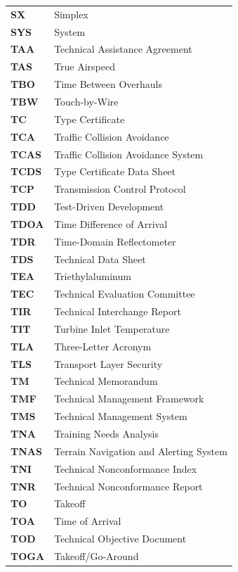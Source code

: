 \begin{longtable}{p{3cm}p{11cm}}
\textbf{SX} & Simplex \\
\textbf{SYS} & System \\
\textbf{TAA} & Technical Assistance Agreement \\
\textbf{TAS} & True Airspeed \\
\textbf{TBO} & Time Between Overhauls \\
\textbf{TBW} & Touch-by-Wire \\
\textbf{TC} & Type Certificate \\
\textbf{TCA} & Traffic Collision Avoidance \\
\textbf{TCAS} & Traffic Collision Avoidance System \\
\textbf{TCDS} & Type Certificate Data Sheet \\
\textbf{TCP} & Transmission Control Protocol \\
\textbf{TDD} & Test-Driven Development \\
\textbf{TDOA} & Time Difference of Arrival \\
\textbf{TDR} & Time-Domain Reflectometer \\
\textbf{TDS} & Technical Data Sheet \\
\textbf{TEA} & Triethylaluminum \\
\textbf{TEC} & Technical Evaluation Committee \\
\textbf{TIR} & Technical Interchange Report \\
\textbf{TIT} & Turbine Inlet Temperature \\
\textbf{TLA} & Three-Letter Acronym \\
\textbf{TLS} & Transport Layer Security \\
\textbf{TM} & Technical Memorandum \\
\textbf{TMF} & Technical Management Framework \\
\textbf{TMS} & Technical Management System \\
\textbf{TNA} & Training Needs Analysis \\
\textbf{TNAS} & Terrain Navigation and Alerting System \\
\textbf{TNI} & Technical Nonconformance Index \\
\textbf{TNR} & Technical Nonconformance Report \\
\textbf{TO} & Takeoff \\
\textbf{TOA} & Time of Arrival \\
\textbf{TOD} & Technical Objective Document \\
\textbf{TOGA} & Takeoff/Go-Around \\

\end{longtable}
